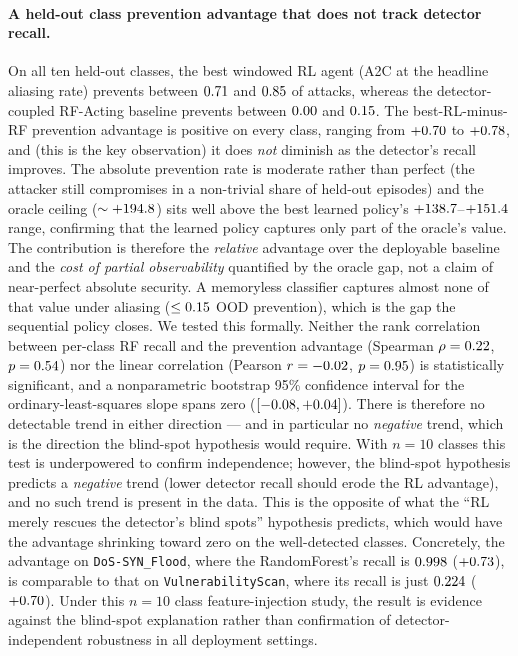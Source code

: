 \paragraph{A held-out class prevention advantage that does not track detector recall.} On all ten held-out classes, the best windowed RL agent (A2C at the headline aliasing rate) prevents between $0.71$ and $0.85$ of attacks, whereas the detector-coupled RF-Acting baseline prevents between $0.00$ and $0.15$. The best-RL-minus-RF prevention advantage is positive on every class, ranging from $+0.70$ to $+0.78$, and (this is the key observation) it does \emph{not} diminish as the detector's recall improves. The absolute prevention rate is moderate rather than perfect (the attacker still compromises in a non-trivial share of held-out episodes) and the oracle ceiling ($\sim+194.8$) sits well above the best learned policy's $+138.7$--$+151.4$ range, confirming that the learned policy captures only part of the oracle's value. The contribution is therefore the \emph{relative} advantage over the deployable baseline and the \emph{cost of partial observability} quantified by the oracle gap, not a claim of near-perfect absolute security. A memoryless classifier captures almost none of that value under aliasing ($\leq 0.15$ OOD prevention), which is the gap the sequential policy closes. We tested this formally. Neither the rank correlation between per-class RF recall and the prevention advantage (Spearman $\rho = 0.22$, $p = 0.54$) nor the linear correlation (Pearson $r = -0.02$, $p = 0.95$) is statistically significant, and a nonparametric bootstrap 95\% confidence interval for the ordinary-least-squares slope spans zero ($[-0.08, +0.04]$). There is therefore no detectable trend in either direction --- and in particular no \emph{negative} trend, which is the direction the blind-spot hypothesis would require. With $n=10$ classes this test is underpowered to confirm independence; however, the blind-spot hypothesis predicts a \emph{negative} trend (lower detector recall should erode the RL advantage), and no such trend is present in the data. This is the opposite of what the ``RL merely rescues the detector's blind spots'' hypothesis predicts, which would have the advantage shrinking toward zero on the well-detected classes. Concretely, the advantage on \texttt{DoS-SYN\_Flood}, where the RandomForest's recall is $0.998$ ($+0.73$), is comparable to that on \texttt{VulnerabilityScan}, where its recall is just $0.224$ ($+0.70$). Under this $n=10$ class feature-injection study, the result is evidence against the blind-spot explanation rather than confirmation of detector-independent robustness in all deployment settings.


